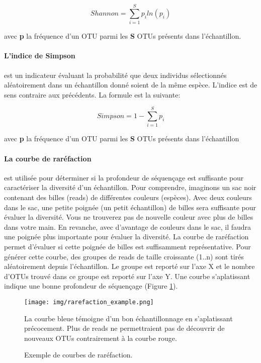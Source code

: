 \documentclass[12pt,a4paper]{article}
\begin{document}
\begin{mycapequ}[!h]
   \begin{equation}
     Shannon = \sum_{i=1}^Sp_{i}ln(p_{i})
   \end{equation}
      \caption{avec \textbf{p} la fréquence d'un OTU parmi les \textbf{S} OTUs présents dans l'échantillon.}
\end{mycapequ}

\paragraph{L'indice de Simpson}est un indicateur évaluant la probabilité que deux individus sélectionnés aléatoirement dans un échantillon donné soient de la même espèce. L'indice est de sens contraire aux précédents. La formule est la suivante:

\begin{mycapequ}[!h]
   \begin{equation}
     Simpson = 1 - \sum_{i=1}^Sp_{i}
   \end{equation}
      \caption{avec \textbf{p} la fréquence d'un OTU parmi les \textbf{S} OTUs présents dans l'échantillon}
\end{mycapequ}

\paragraph{La courbe de raréfaction} est utilisée pour déterminer si la profondeur de séquençage est suffisante pour caractériser la diversité d’un échantillon. Pour comprendre, imaginons un sac noir contenant des billes (reads) de différentes couleurs (espèces). Avec deux couleurs dans le sac, une petite poignée (un petit échantillon) de billes sera suffisante pour évaluer la diversité. Vous ne trouverez pas de nouvelle couleur avec plus de billes dans votre main. En revanche, avec d'avantage de couleurs dans le sac, il faudra une poignée plus importante pour évaluer la diversité. La courbe de raréfaction permet d'évaluer si cette poignée de billes est suffisamment représentative.
Pour générer cette courbe, des groupes de reads de taille croissante (1..n) sont tirés aléatoirement depuis l'échantillon. Le groupe est reporté sur l'axe X et le nombre d'OTUs trouvé dans ce groupe est reporté sur l’axe Y.
Une courbe s’aplatissant indique une bonne profondeur de séquençage (Figure \ref{rarefaction_demo}).


\begin{figure}[ht]
\begin{center}
\texttt{[image: img/rarefaction\_example.png]}\hfill
\end{center}
\caption{Exemple de courbes de raréfaction.} La courbe bleue témoigne d'un bon échantillonnage en s’aplatissant précocement. Plus de reads ne permettraient pas de découvrir de nouveaux OTUs contrairement à la courbe rouge.
\label{rarefaction_demo}
\end{figure}
\end{document}
